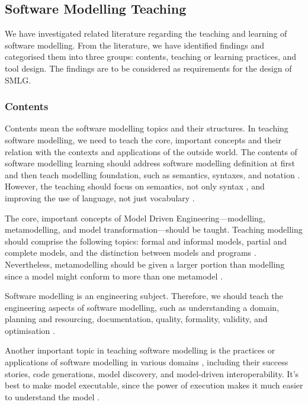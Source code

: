 \documentclass[12pt, a4paper]{report}
\begin{document}
{\subsection{Software Modelling Teaching}
\label{Software Modelling Teaching}
We have investigated related literature regarding the teaching and learning of software modelling. From the literature, we have identified findings and categorised them into three groups: contents, teaching or learning practices, and tool design. The findings are to be considered as requirements for the design of SMLG. 

\subsubsection{Contents}
Contents mean the software modelling topics and their structures. In teaching software modelling, we need to teach the core, important concepts and their relation with the contexts and applications of the outside world. The contents of software modelling learning should address software modelling definition at first \cite{borstler2012teaching} and then teach modelling foundation, such as semantics, syntaxes, and notation \cite{borstler2012teaching}. However, the teaching should focus on semantics, not only syntax \cite{borstler2012teaching}, and improving the use of language, not just vocabulary \cite{bezivin2009teaching}. 

The core, important concepts of Model Driven Engineering---modelling, metamodelling, and model transformation---should be taught. Teaching modelling should comprise the following topics: formal and informal models, partial and complete models, and the distinction between models and programs \cite{bezivin2009teaching}. Nevertheless, metamodelling should be given a larger portion than modelling since a model might conform to more than one metamodel \cite{ober2007teaching}. 

Software modelling is an engineering subject. Therefore, we should teach the engineering aspects of software modelling, such as understanding a domain, planning and resourcing, documentation, quality, formality, validity, and optimisation \cite{paige2014bad}.

Another important topic in teaching software modelling is the practices or applications of software modelling in various domains \cite{ borstler2012teaching, paige2014bad}, including their success stories, code generations, model discovery, and model-driven interoperability. It's best to make model executable, since the power of execution makes it much easier to understand the model \cite{bezivin2009teaching}.

}
\end{document}
